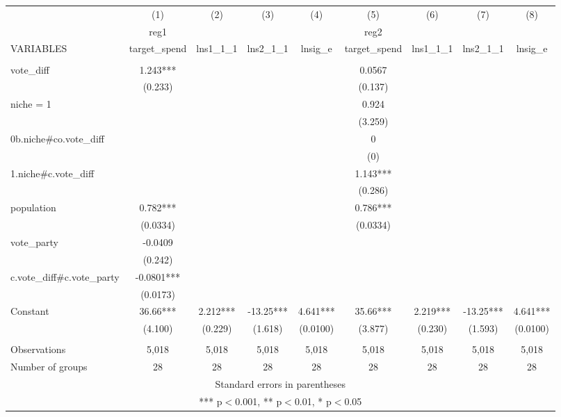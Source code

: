 \documentclass[]{article}
\begin{document}
\begin{tabular}{lcccccccc} \hline
 & (1) & (2) & (3) & (4) & (5) & (6) & (7) & (8) \\
 & reg1 &  &  &  & reg2 &  &  &  \\
VARIABLES & target\_spend & lns1\_1\_1 & lns2\_1\_1 & lnsig\_e & target\_spend & lns1\_1\_1 & lns2\_1\_1 & lnsig\_e \\ \hline
 &  &  &  &  &  &  &  &  \\
vote\_diff & 1.243*** &  &  &  & 0.0567 &  &  &  \\
 & (0.233) &  &  &  & (0.137) &  &  &  \\
niche = 1 &  &  &  &  & 0.924 &  &  &  \\
 &  &  &  &  & (3.259) &  &  &  \\
0b.niche\#co.vote\_diff &  &  &  &  & 0 &  &  &  \\
 &  &  &  &  & (0) &  &  &  \\
1.niche\#c.vote\_diff &  &  &  &  & 1.143*** &  &  &  \\
 &  &  &  &  & (0.286) &  &  &  \\
population & 0.782*** &  &  &  & 0.786*** &  &  &  \\
 & (0.0334) &  &  &  & (0.0334) &  &  &  \\
vote\_party & -0.0409 &  &  &  &  &  &  &  \\
 & (0.242) &  &  &  &  &  &  &  \\
c.vote\_diff\#c.vote\_party & -0.0801*** &  &  &  &  &  &  &  \\
 & (0.0173) &  &  &  &  &  &  &  \\
Constant & 36.66*** & 2.212*** & -13.25*** & 4.641*** & 35.66*** & 2.219*** & -13.25*** & 4.641*** \\
 & (4.100) & (0.229) & (1.618) & (0.0100) & (3.877) & (0.230) & (1.593) & (0.0100) \\
 &  &  &  &  &  &  &  &  \\
Observations & 5,018 & 5,018 & 5,018 & 5,018 & 5,018 & 5,018 & 5,018 & 5,018 \\
 Number of groups & 28 & 28 & 28 & 28 & 28 & 28 & 28 & 28 \\ \hline
\multicolumn{9}{c}{ Standard errors in parentheses} \\
\multicolumn{9}{c}{ *** p$<$0.001, ** p$<$0.01, * p$<$0.05} \\
\end{tabular}
\end{document}
